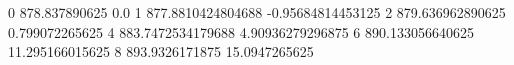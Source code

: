 0 878.837890625 0.0
1 877.8810424804688 -0.95684814453125
2 879.636962890625 0.799072265625
4 883.7472534179688 4.90936279296875
6 890.133056640625 11.295166015625
8 893.9326171875 15.0947265625
